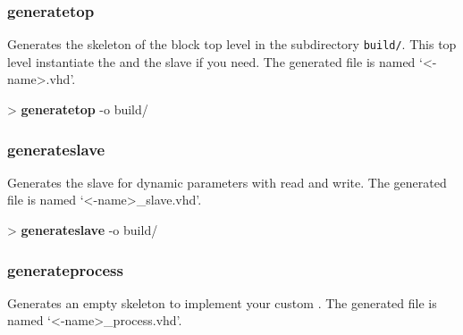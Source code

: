 \documentclass[10pt,a4paper]{article}
\begin{document}
\subsubsection{generatetop}

Generates the skeleton of the block top level in the subdirectory \texttt{build/}. This top level instantiate the \kind{} and the slave if you need. The generated file is named `<\kind{}-name>.vhd'.\\


\begin{sampletitle}
> \textbf{\tool{} generatetop} -o build/
\end{sampletitle}

\subsubsection{generateslave}

Generates the slave for dynamic parameters with read and write. The generated file is named `<\kind{}-name>\_slave.vhd'.\\


\begin{sampletitle}
> \textbf{\tool{} generateslave} -o build/
\end{sampletitle}

\subsubsection{generateprocess}

Generates an empty skeleton to implement your custom \kind{}. The generated file is named `<\kind{}-name>\_process.vhd'.\\

\end{document}
